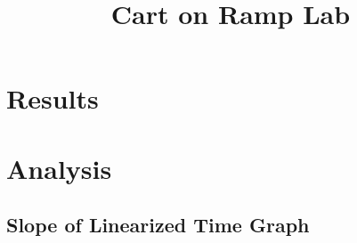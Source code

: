 \documentclass{article}
\title{Cart on Ramp Lab}
\begin{document}
\section{Results}
\section{Analysis}
\subsection{Slope of Linearized Time Graph}
\end{document}

